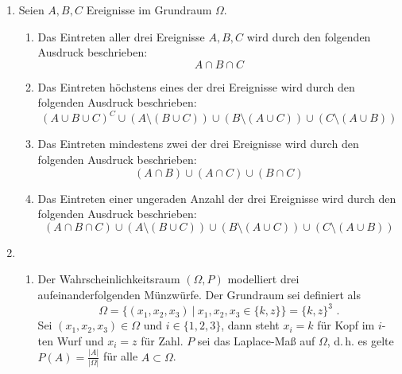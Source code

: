 \documentclass[a4paper]{scrartcl}
\begin{document}
\begin{enumerate}[label=\bfseries\arabic*.]
    \item
        Seien $A,B,C$ Ereignisse im Grundraum $\Omega$.
        \begin{enumerate}[label=(\alph*)]
            \item
                Das Eintreten aller drei Ereignisse $A, B, C$ wird durch
                den folgenden Ausdruck beschrieben:
                \begin{equation}
                    A \cap B \cap C
                \end{equation}

            \item
                Das Eintreten höchstens eines der drei Ereignisse wird durch
                den folgenden Ausdruck beschrieben:
                \begin{equation}
                    (A \cup B \cup C)^C
                    \cup (A \setminus (B \cup C))
                    \cup (B \setminus (A \cup C))
                    \cup (C \setminus (A \cup B))
                \end{equation}

            \item
                Das Eintreten mindestens zwei der drei Ereignisse wird durch
                den folgenden Ausdruck beschrieben:
                \begin{equation}
                    (A \cap B) \cup (A \cap C) \cup (B \cap C)
                \end{equation}

            \item
                Das Eintreten einer ungeraden Anzahl der drei Ereignisse wird
                durch den folgenden Ausdruck beschrieben:
                \begin{equation}
                    (A \cap B \cap C)
                    \cup (A \setminus (B \cup C))
                    \cup (B \setminus (A \cup C))
                    \cup (C \setminus (A \cup B))
                \end{equation}

        \end{enumerate}

    \item
        \begin{enumerate}[label=(\alph*)]
            \item
                Der Wahrscheinlichkeitsraum $(\Omega, P)$ modelliert drei
                aufeinanderfolgenden Münzwürfe.
                Der Grundraum sei definiert als
                \begin{equation}
                    \Omega = \Big\{
                        (x_1, x_2, x_3) \ \vert\  x_1, x_2, x_3 \in \{k, z\}
                    \Big\}
                    = \{k, z\}^3
                    \text{ .}
                \end{equation}
                Sei $(x_1, x_2, x_3) \in \Omega$ und $i \in \{1,2,3\}$, dann
                steht $x_i = k$ für Kopf im $i$-ten Wurf und $x_i = z$ für Zahl.
                $P$ sei das Laplace-Maß auf $\Omega$, d.\,h. es gelte
                $P(A) = \frac{|A|}{|\Omega|}$ für alle $A \subset \Omega$.


\end{enumerate}
\end{enumerate}
\end{document}
